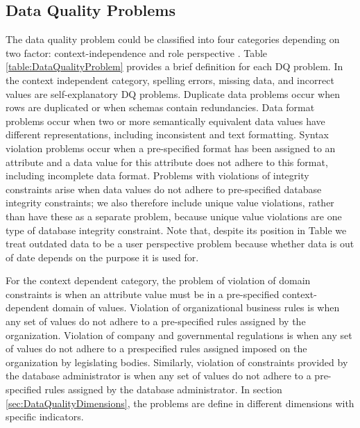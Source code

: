 \documentclass[pdftex,english,oribibl]{llncs}
\begin{document}
\subsection{Data Quality Problems}\label{sec:DataQualityProblems}
The data quality problem could be classified into four categories depending on two factor: context-independence and role perspective \cite{Borek2011AClassficationOfDataQualityAssessmentMethod}.
 Table \ref{table:DataQualityProblem} provides a brief definition for each DQ problem.
 In the context independent category, spelling errors, missing data, and incorrect values are self-explanatory DQ problems.
 Duplicate data problems occur when rows are duplicated or when schemas contain redundancies.
 Data format problems occur when two or more semantically equivalent data values have different representations, including inconsistent and text formatting.
 Syntax violation problems occur when a pre-specified format has been assigned to an attribute and a data value for this attribute does not adhere to this format, including incomplete data format.
 Problems with violations of integrity constraints arise when data values do not adhere to pre-specified database integrity constraints; we also therefore include unique value violations, rather than have these as a separate problem, because unique value violations are one type of database integrity constraint.
 Note that, despite its position in Table we treat outdated data to be a user perspective problem because whether data is out of date depends on the purpose it is used for.

 For the context dependent category, the problem of violation of domain constraints is when an attribute value must be in a pre-specified context-dependent domain of values.
 Violation of organizational business rules is when any set of values do not adhere to a pre-specified rules assigned by the organization.
 Violation of company and governmental regulations is when any set of values do not adhere to a prespecified rules assigned imposed on the organization by legislating bodies.
 Similarly, violation of constraints provided by the database administrator is when any set of values do not adhere to a pre-specified rules assigned by the database administrator. In section \ref{sec:DataQualityDimensions}, the problems are define in different dimensions with specific indicators.
\end{document}
